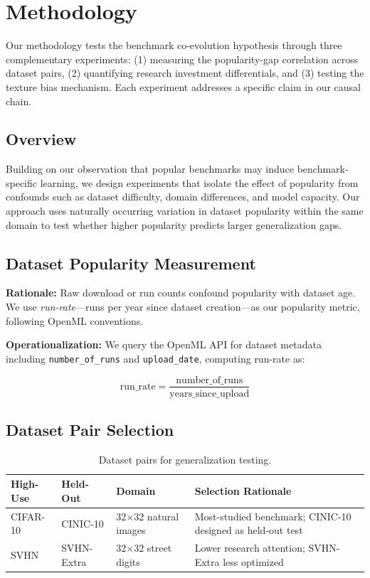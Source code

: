\section{Methodology}

Our methodology tests the benchmark co-evolution hypothesis through three complementary experiments: (1) measuring the popularity-gap correlation across dataset pairs, (2) quantifying research investment differentials, and (3) testing the texture bias mechanism. Each experiment addresses a specific claim in our causal chain.

\subsection{Overview}

Building on our observation that popular benchmarks may induce benchmark-specific learning, we design experiments that isolate the effect of popularity from confounds such as dataset difficulty, domain differences, and model capacity. Our approach uses naturally occurring variation in dataset popularity within the same domain to test whether higher popularity predicts larger generalization gaps.

\subsection{Dataset Popularity Measurement}

\textbf{Rationale:} Raw download or run counts confound popularity with dataset age. We use \emph{run-rate}---runs per year since dataset creation---as our popularity metric, following OpenML conventions.

\textbf{Operationalization:} We query the OpenML API for dataset metadata including \texttt{number\_of\_runs} and \texttt{upload\_date}, computing run-rate as:

\begin{equation}
\text{run\_rate} = \frac{\text{number\_of\_runs}}{\text{years\_since\_upload}}
\end{equation}

\subsection{Dataset Pair Selection}

\begin{table}[h]
\centering
\caption{Dataset pairs for generalization testing.}
\begin{tabular}{@{}llll@{}}
\toprule
High-Use & Held-Out & Domain & Selection Rationale \\
\midrule
CIFAR-10 & CINIC-10 & 32$\times$32 natural images & Most-studied benchmark; CINIC-10 designed as held-out test \\
SVHN & SVHN-Extra & 32$\times$32 street digits & Lower research attention; SVHN-Extra less optimized \\
\bottomrule
\end{tabular}
\end{table}

